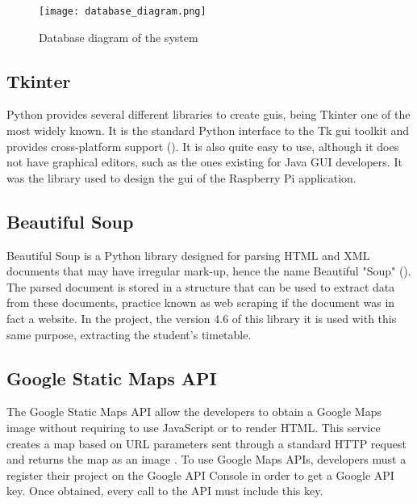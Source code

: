 	\begin{figure}[!ht]
		\centering
		\texttt{[image: database\_diagram.png]}
		\caption{Database diagram of the system}
		\label{fig:database_diagram}
	\end{figure}

	\subsection{Tkinter} 
	Python provides several different libraries to create \glspl{gui}, being Tkinter one of the most widely known. It is the standard Python interface to the Tk \gls{gui} toolkit and provides cross-platform support (\cite{tkinter_docs}). It is also quite easy to use, although it does not have graphical editors, such as the ones existing for Java GUI developers. It was the library used to design the \gls{gui} of the Raspberry Pi application.  

	\subsection{Beautiful Soup}
	Beautiful Soup is a Python library designed for parsing HTML and XML documents that may have irregular mark-up, hence the name Beautiful "Soup" (\cite{beautiful_soup_main}). The parsed document is stored in a structure that can be used to extract data from these documents, practice known as web scraping if the document was in fact a website. In the project, the version 4.6 of this library it is used with this same purpose, extracting the student's timetable. 	

	\subsection{Google Static Maps API}
	The Google Static Maps API allow the developers to obtain a Google Maps image without requiring to use JavaScript or to render HTML. This service creates a map based on URL parameters sent through a standard HTTP request and returns the map as an image \cite{google_maps_static}. To use Google Maps APIs, developers must a register their project on the Google API Console in order to get a Google API key. Once obtained, every call to the API must include this key.
	


